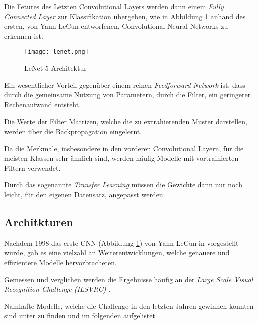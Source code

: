 Die Fetures des Letzten Convolutional Layers werden dann einem 
\textit{Fully Connected Layer}  zur Klassifikation 
übergeben, wie in Abbildung \ref{fig:lenet} anhand des 
ersten, von Yann LeCun entworfenen, Convolutional Neural 
Networks zu erkennen ist.

\vspace{1cm}
\begin{figure}[H]
    \centering
    \texttt{[image: lenet.png]}
    \caption{LeNet-5 Architektur
    \cite{lecunGradientBasedLearningApplied1998}}
    \label{fig:lenet}
\end{figure}
\vspace{1cm}

Ein wesentlicher Vorteil gegenüber einem reinen 
\textit{Feedforward Network} ist, dass 
durch die gemeinsame Nutzung von Parametern, 
durch die Filter, ein geringerer Rechenaufwand entsteht.

Die Werte der Filter Matrizen, welche die zu 
extrahierenden Muster darstellen, 
werden über die Backpropagation eingelernt.

Da die Merkmale, insbesondere in den vorderen Convolutional 
Layern, für die meisten Klassen sehr ähnlich sind,
werden häufig Modelle mit vortrainierten Filtern 
verwendet.

Durch das sogenannte \textit{Transfer Learning}
müssen die Gewichte dann nur noch leicht, 
für den eigenen Datensatz, angepasst werden.



\subsection{Architkturen}\label{subsubsec:architectures}

Nachdem 1998 das erste CNN (Abbildung \ref{fig:lenet})
 von Yann LeCun in 
\cite{lecunGradientBasedLearningApplied1998} 
vorgestellt wurde, gab es eine vielzahl 
an Weiterentwicklungen, welche genauere und 
effizientere Modelle hervorbracheten.

Gemessen und verglichen werden die Ergebnisse häufig an 
der \textit{Large Scale Visual Recognition Challenge (ILSVRC)}
\cite{ImageNetLargeScale}.
 
Namhafte Modelle, welche die Challenge in den letzten 
Jahren gewinnen konnten sind unter \cite{stanfordConvNetList}
zu finden und im folgenden aufgelistet.

